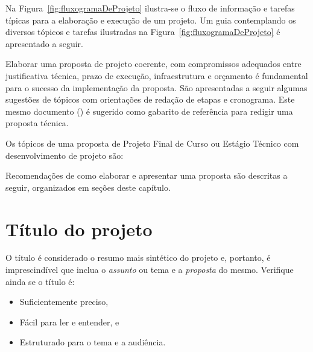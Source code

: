 Na Figura~\ref{fig:fluxogramaDeProjeto} ilustra-se o fluxo de informação e tarefas típicas para a elaboração e execução de um projeto. Um guia  contemplando os diversos tópicos e tarefas ilustradas na Figura~\ref{fig:fluxogramaDeProjeto} é apresentado a seguir.



Elaborar uma proposta de projeto coerente, com compromissos adequados entre justificativa técnica, prazo de execução, infraestrutura e orçamento é fundamental para o sucesso da implementação da proposta. São apresentadas a seguir algumas sugestões de tópicos com orientações de redação de etapas e cronograma. Este mesmo documento (\cite{bragaAR2021}) é sugerido como gabarito de referência para redigir uma proposta técnica. 


Os tópicos de uma proposta de Projeto Final de Curso ou Estágio Técnico com desenvolvimento de projeto são:

%

Recomendações de como elaborar e apresentar uma proposta são descritas a seguir, organizados em seções deste capítulo.

\section{Título do projeto}

O título é considerado o resumo mais sintético do projeto e, portanto, é
imprescindível que inclua o \emph{assunto} ou tema e a \emph{proposta} do mesmo.
Verifique ainda se o título é:
\begin{itemize}
	\item  Suficientemente preciso,
	\item  Fácil para ler e entender, e
	\item  Estruturado para o tema e a audiência.
\end{itemize}


